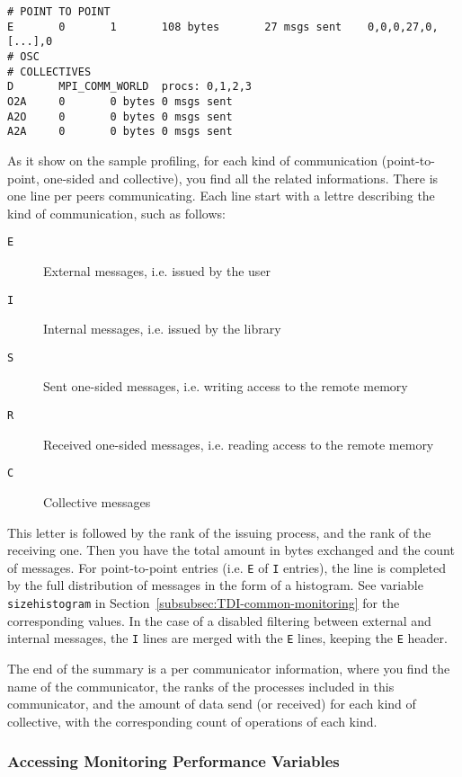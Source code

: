 \begin{verbatim}
# POINT TO POINT
E       0       1       108 bytes       27 msgs sent    0,0,0,27,0,[...],0
# OSC
# COLLECTIVES
D       MPI_COMM_WORLD  procs: 0,1,2,3
O2A     0       0 bytes 0 msgs sent
A2O     0       0 bytes 0 msgs sent
A2A     0       0 bytes 0 msgs sent
\end{verbatim}

As it show on the sample profiling, for each kind of communication
(point-to-point, one-sided and collective), you find all the related
informations. There is one line per peers communicating. Each line
start with a lettre describing the kind of communication, such as
follows:

\begin{description}
\item [{\tt E}] External messages, i.e. issued by the user
\item [{\tt I}] Internal messages, i.e. issued by the library
\item [{\tt S}] Sent one-sided messages, i.e. writing access to the remote memory
\item [{\tt R}] Received one-sided messages, i.e. reading access to the remote memory
\item [{\tt C}] Collective messages
\end{description}

This letter is followed by the rank of the issuing process, and the
rank of the receiving one. Then you have the total amount in bytes
exchanged and the count of messages. For point-to-point entries
(i.e. {\tt E} of {\tt I} entries), the line is completed by the full
distribution of messages in the form of a histogram. See variable {\tt
  size\brkunds{}histogram} in
Section~\ref{subsubsec:TDI-common-monitoring} for the corresponding
values. In the case of a disabled filtering between external and
internal messages, the {\tt I} lines are merged with the {\tt E}
lines, keeping the {\tt E} header.

The end of the summary is a per communicator information, where you
find the name of the communicator, the ranks of the processes included
in this communicator, and the amount of data send (or received) for
each kind of collective, with the corresponding count of operations of
each kind.

\subsubsection{Accessing Monitoring Performance Variables}

